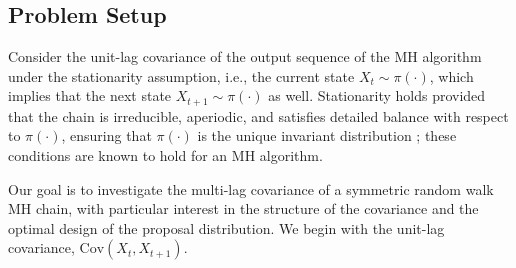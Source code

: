 \documentclass[conference]{IEEEtran}
\theoremstyle{definition}
\begin{document}
\subsection{Problem Setup}
Consider the unit-lag covariance of the output sequence of the MH algorithm under the stationarity assumption, 
i.e., the current state $X_t \sim \pi(\cdot)$, which implies that the next state $X_{t+1} \sim \pi(\cdot)$ as well. 
Stationarity holds provided that the chain is irreducible, aperiodic, and satisfies detailed balance with respect to $\pi(\cdot)$, 
ensuring that $\pi(\cdot)$ is the unique invariant distribution \cite{HillandSpall}; these conditions are known to hold for an MH algorithm.

Our goal is to investigate the multi-lag covariance of a symmetric random walk MH chain, 
with particular interest in the structure of the covariance and the optimal design of the proposal distribution. 
We begin with the unit-lag covariance, $\mathrm{Cov}(X_t, X_{t+1})$.
\end{document}
